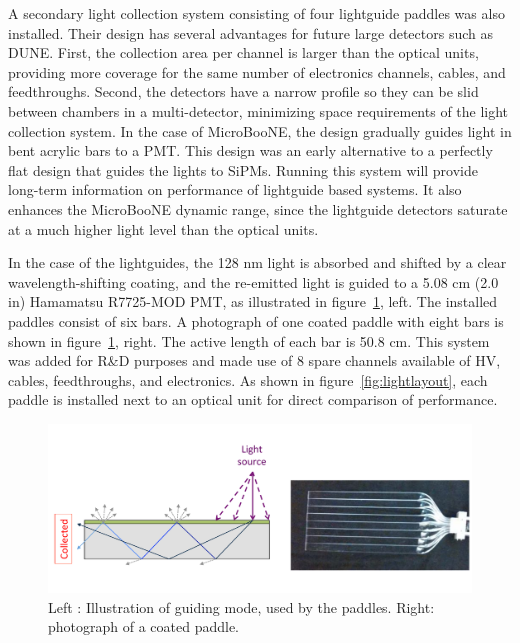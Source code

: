 A secondary light collection system consisting of four lightguide paddles was also installed.   Their design has several advantages for future large detectors such as DUNE. First, the collection area per channel is larger than the optical units, providing more coverage for the same number of electronics channels, cables, and feedthroughs.  Second, the detectors have a narrow profile so they can be slid between chambers in a multi-\lartpc detector, minimizing space requirements of the light collection system.  In the case of MicroBooNE, the design gradually guides light in bent acrylic bars to a PMT.  This design was an early alternative to a perfectly flat design that guides the lights to SiPMs.  Running this system will provide long-term information on performance of lightguide based systems.  It also enhances the MicroBooNE dynamic range, since the lightguide detectors saturate at a much higher light level than the optical units.

In the case of the lightguides, the 128 nm light is absorbed and shifted by a clear wavelength-shifting coating, and the re-emitted light is guided to a 5.08 cm (2.0 in) Hamamatsu R7725-MOD PMT, as illustrated in figure~\ref{fig:LGCoating}, left. The installed paddles consist of six bars.  A photograph of one coated paddle with eight bars is shown in figure~\ref{fig:LGCoating}, right.  The active length of each bar is 50.8 cm.  This system was added for R\&D purposes and made use of 8 spare channels available of HV, cables, feedthroughs, and electronics.  As shown in figure~\ref{fig:lightlayout}, each paddle is installed next to an optical unit for direct comparison of performance.

\begin{figure}
\centering 
\includegraphics[width=\textwidth]{./figures/LightguideModeAndPhoto.pdf}
\caption{Left : Illustration of guiding mode, used by the paddles. Right: photograph of a coated paddle. \label{fig:LGCoating}}
\end{figure}



